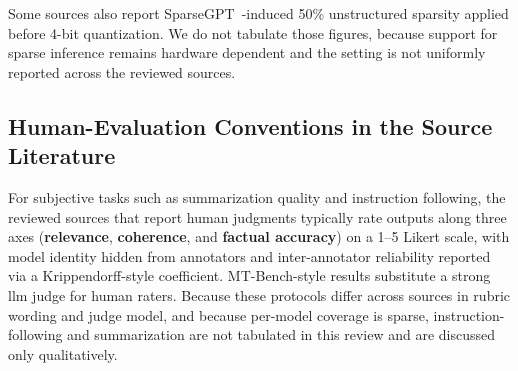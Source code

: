 Some sources also report SparseGPT~\citep{frantar2023sparsegpt}-induced 50\% unstructured sparsity applied before 4-bit quantization. We do not tabulate those figures, because support for sparse inference remains hardware dependent and the setting is not uniformly reported across the reviewed sources.

\subsection{Human-Evaluation Conventions in the Source Literature}
\label{subsec:appendix_human_eval}
For subjective tasks such as summarization quality and instruction following, the reviewed sources that report human judgments typically rate outputs along three axes (\textbf{relevance}, \textbf{coherence}, and \textbf{factual accuracy}) on a 1--5 Likert scale, with model identity hidden from annotators and inter-annotator reliability reported via a Krippendorff-style coefficient. MT-Bench-style results substitute a strong \gls{llm} judge for human raters. Because these protocols differ across sources in rubric wording and judge model, and because per-model coverage is sparse, instruction-following and summarization are not tabulated in this review and are discussed only qualitatively.

